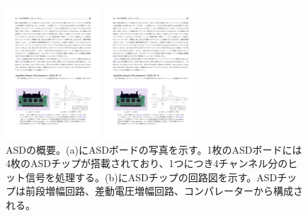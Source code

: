     \begin{figure}
    \begin{minipage}[b]{.5\linewidth}
    \centering
    \includegraphics[height=5cm]{fig/Intro/TGC_ASD.pdf}
    \end{minipage}%
    \begin{minipage}[b]{.5\linewidth}
    \centering
    \includegraphics[height=5cm]{fig/Intro/TGC_ASDcircuite.pdf}
    \end{minipage}%
    \caption[ASDの概要]{ASDの概要\cite{ASD}。(a)にASDボードの写真を示す。1枚のASDボードには4枚のASDチップが搭載されており、1つにつき4チャンネル分のヒット信号を処理する。(b)にASDチップの回路図を示す。ASDチップは前段増幅回路、差動電圧増幅回路、コンパレーターから構成される。}
    \label{TGC_ASD}
    \end{figure}

